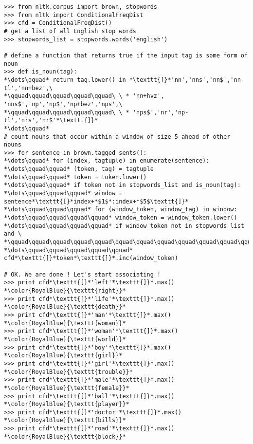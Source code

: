 \documentclass[11pt]{article}
\begin{document}
\begin{lstlisting}[float,caption=Performing free word association using NLTK.,label=wordassoc,frame=trBL,framexrightmargin=25pt,escapechar=*]
>>> from nltk.corpus import brown, stopwords
>>> from nltk import ConditionalFreqDist
>>> cfd = ConditionalFreqDist()
# get a list of all English stop words
>>> stopwords_list = stopwords.words('english')

# define a function that returns true if the input tag is some form of noun
>>> def is_noun(tag):
*\dots\qquad* return tag.lower() in *\texttt{[}*'nn','nns','nn$','nn-tl','nn+bez',\
*\qquad\qquad\qquad\qquad\qquad\ \ * 'nn+hvz', 'nns$','np','np$','np+bez','nps',\
*\qquad\qquad\qquad\qquad\qquad\ \ * 'nps$','nr','np-tl','nrs','nr$'*\texttt{]}*
*\dots\qquad*
# count nouns that occur within a window of size 5 ahead of other nouns
>>> for sentence in brown.tagged_sents():
*\dots\qquad* for (index, tagtuple) in enumerate(sentence):
*\dots\qquad\qquad* (token, tag) = tagtuple
*\dots\qquad\qquad* token = token.lower()
*\dots\qquad\qquad* if token not in stopwords_list and is_noun(tag):
*\dots\qquad\qquad\qquad* window = sentence*\texttt{[}*index+*$1$*:index+*$5$\texttt{]}*
*\dots\qquad\qquad\qquad* for (window_token, window_tag) in window:
*\dots\qquad\qquad\qquad\qquad* window_token = window_token.lower()
*\dots\qquad\qquad\qquad\qquad* if window_token not in stopwords_list and \
*\qquad\qquad\qquad\qquad\qquad\qquad\qquad\qquad\qquad\qquad\qquad\qquad*is_noun(window_tag):
*\dots\qquad\qquad\qquad\qquad\qquad* cfd*\texttt{[}*token*\texttt{]}*.inc(window_token)

# OK. We are done ! Let's start associating !
>>> print cfd*\texttt{[}*'left'*\texttt{]}*.max()
*\color{RoyalBlue}{\texttt{right}}*
>>> print cfd*\texttt{[}*'life'*\texttt{]}*.max()
*\color{RoyalBlue}{\texttt{death}}*
>>> print cfd*\texttt{[}*'man'*\texttt{]}*.max()
*\color{RoyalBlue}{\texttt{woman}}*
>>> print cfd*\texttt{[}*'woman'*\texttt{]}*.max()
*\color{RoyalBlue}{\texttt{world}}*
>>> print cfd*\texttt{[}*'boy'*\texttt{]}*.max()
*\color{RoyalBlue}{\texttt{girl}}*
>>> print cfd*\texttt{[}*'girl'*\texttt{]}*.max()
*\color{RoyalBlue}{\texttt{trouble}}*
>>> print cfd*\texttt{[}*'male'*\texttt{]}*.max()
*\color{RoyalBlue}{\texttt{female}}*
>>> print cfd*\texttt{[}*'ball'*\texttt{]}*.max()
*\color{RoyalBlue}{\texttt{player}}*
>>> print cfd*\texttt{[}*'doctor'*\texttt{]}*.max()
*\color{RoyalBlue}{\texttt{bills}}*
>>> print cfd*\texttt{[}*'road'*\texttt{]}*.max()
*\color{RoyalBlue}{\texttt{block}}*

\end{lstlisting}
\end{document}
